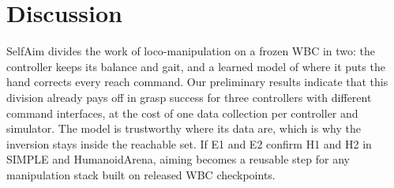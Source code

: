 \documentclass[conference]{IEEEtran}
\begin{document}
\section{Discussion}
SelfAim divides the work of loco-manipulation on a frozen WBC in two: the controller keeps its balance and gait, and a learned model of where it puts the hand corrects every reach command. Our preliminary results indicate that this division already pays off in grasp success for three controllers with different command interfaces, at the cost of one data collection per controller and simulator. The model is trustworthy where its data are, which is why the inversion stays inside the reachable set. If E1 and E2 confirm H1 and H2 in SIMPLE and HumanoidArena, aiming becomes a reusable step for any manipulation stack built on released WBC checkpoints.




\end{document}

